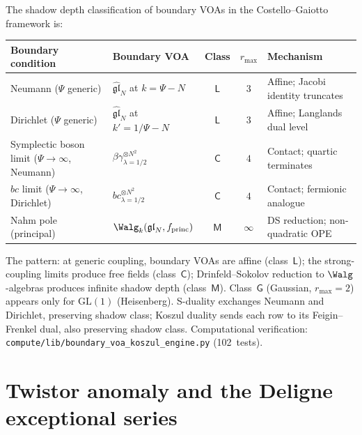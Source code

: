 \begin{remark}
\label{rem:boundary-voa-shadow-depth-classification}
The shadow depth classification of boundary VOAs in the
Costello--Gaiotto framework is:
\begin{center}
\renewcommand{\arraystretch}{1.25}
\small
\begin{tabular}{@{}l@{\;\;}l@{\;\;}c@{\;\;}c@{\;\;}l@{}}
\textbf{Boundary condition}
 & \textbf{Boundary VOA}
 & \textbf{Class}
 & $r_{\max}$
 & \textbf{Mechanism} \\
\midrule
Neumann ($\Psi$ generic)
 & $\widehat{\mathfrak{gl}}_N$ at $k = \Psi - N$
 & $\mathsf{L}$
 & $3$
 & Affine; Jacobi identity truncates \\
Dirichlet ($\Psi$ generic)
 & $\widehat{\mathfrak{gl}}_N$ at $k' = 1/\Psi - N$
 & $\mathsf{L}$
 & $3$
 & Affine; Langlands dual level \\
Symplectic boson limit ($\Psi\to\infty$, Neumann)
 & $\beta\gamma^{\otimes N^2}_{\lambda=1/2}$
 & $\mathsf{C}$
 & $4$
 & Contact; quartic terminates \\
$bc$ limit ($\Psi\to\infty$, Dirichlet)
 & $bc^{\otimes N^2}_{\lambda=1/2}$
 & $\mathsf{C}$
 & $4$
 & Contact; fermionic analogue \\
Nahm pole (principal)
 & $\Walg_k(\mathfrak{gl}_N, f_{\mathrm{princ}})$
 & $\mathsf{M}$
 & $\infty$
 & DS reduction; non-quadratic OPE
\end{tabular}
\end{center}
The pattern: at generic coupling, boundary VOAs are affine
(class~$\mathsf{L}$); the strong-coupling limits produce free
fields (class~$\mathsf{C}$); Drinfeld--Sokolov reduction to
$\Walg$-algebras produces infinite shadow depth (class~$\mathsf{M}$).
Class~$\mathsf{G}$ (Gaussian, $r_{\max} = 2$) appears only
for $\mathrm{GL}(1)$ (Heisenberg).
S-duality exchanges Neumann and Dirichlet, preserving shadow
class; Koszul duality sends each row to its Feigin--Frenkel
dual, also preserving shadow class.
Computational verification:
\texttt{compute/lib/boundary\_voa\_koszul\_engine.py}
(102~tests).
\end{remark}

\section{Twistor anomaly and the Deligne exceptional series}
\label{sec:ht-twistor-deligne}

